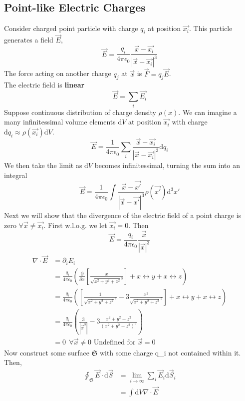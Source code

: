 \documentclass{article}
\theoremstyle{definition}
\theoremstyle{remark}
\begin{document}
\subsection[short]{Point-like Electric Charges}
Consider charged point particle with charge $q_i$ at position $\vec{x_i}$. This particle generates a field $\vec{E}$,
\begin{equation}
    \vec{E} = \frac{q_i}{4\pi\epsilon_0}\frac{\vec{x}-\vec{x_i}}{|\vec{x}-\vec{x_i}|^3}
\end{equation}
The force acting on another charge $q_j$ at $\vec{x}$ is $\vec{F}=q_j\vec{E}$.\\
The electric field is \textbf{linear}
\begin{equation}
    \vec{E} = \sum_{i}\vec{E_i}
\end{equation}
Suppose continuous distribution of charge density $\rho(x)$. We can imagine a many infinitessimal volume elements $\mathrm{d}V$ at position $\vec{x_i}$ with charge $\mathrm{d}q_i\approx\rho(\vec{x_i})\mathrm{d}V$.
\begin{equation}
    \vec{E} = \frac{1}{4\pi\epsilon_0}\sum_{i}\frac{\vec{x}-\vec{x_i}}{|\vec{x}-\vec{x_i}|^3}\mathrm{d}q_i
\end{equation}
We then take the limit as $\mathrm{d}V$ becomes infinitessimal, turning the sum into an integral
\begin{equation}
    \vec{E} = \frac{1}{4\pi\epsilon_0}\int\frac{\vec{x}-\vec{x'}}{|\vec{x}-\vec{x'}|^3}\rho(\vec{x'})\mathrm{d}^3x'
\end{equation}
Next we will show that the divergence of the electric field of a point charge is zero $\forall \vec{x}\neq\vec{x_i}$. First w.l.o.g. we let $\vec{x_i}=0$. Then
\begin{equation*}
    \vec{E} = \frac{q_i}{4\pi\epsilon_0}\frac{\vec{x}}{|\vec{x}|^3}
\end{equation*}
\begin{align*}
    \nabla\cdot \vec{E} &= \partial_iE_i\\
                        &= \frac{q_i}{4\pi\epsilon_0}\left(\frac{\partial}{\partial x}\left[\frac{x}{\sqrt{x^2+y^2+z^2}^3}\right]+ x \leftrightarrow y + x \leftrightarrow z\right)\\
                        &= \frac{q_i}{4\pi\epsilon_0}\left(\left[\frac{1}{\sqrt{x^2+y^2+z^2}^3} - 3\frac{x^2}{\sqrt{x^2+y^2+z^2}^5}\right] + x \leftrightarrow y + x \leftrightarrow z\right)\\
                        &= \frac{q_i}{4\pi\epsilon_0}\left(\frac{3}{|\vec{x}^3|} - 3\frac{x^2+y^2+z^2}{(x^2+y^2+z^2)^5}\right)\\
                        &= 0 ~~\forall \vec{x}\neq 0 \text{ Undefined for }\vec{x}=0
\end{align*}
Now construct some surface $\mathfrak{S}$ with some charge q_i not contained within it. Then,
\begin{align*}
    \oint_{\mathfrak{S}}\vec{E}\cdot\mathrm{d}\vec{S} &= \lim_{i\to\infty}\sum_{i}\vec{E}_i\mathrm{d}\vec{S}_i\\
                                                      &=\int \mathrm{d}V \nabla\cdot\vec{E}
\end{align*}
\end{document}

